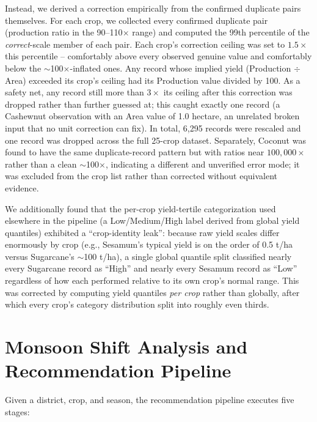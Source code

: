\documentclass[conference]{IEEEtran}
\begin{document}
Instead, we derived a correction empirically from the confirmed duplicate pairs
themselves. For each crop, we collected every confirmed duplicate pair (production
ratio in the 90--110$\times$ range) and computed the 99th percentile of the
\emph{correct}-scale member of each pair. Each crop's correction ceiling was set to
$1.5\times$ this percentile -- comfortably above every observed genuine value and
comfortably below the $\sim$100$\times$-inflated ones. Any record whose implied yield
(Production $\div$ Area) exceeded its crop's ceiling had its Production value divided
by 100. As a safety net, any record still more than $3\times$ its ceiling after this
correction was dropped rather than further guessed at; this caught exactly one record
(a Cashewnut observation with an Area value of 1.0 hectare, an unrelated broken input
that no unit correction can fix). In total, 6{,}295 records were rescaled and one
record was dropped across the full 25-crop dataset. Separately, Coconut was found to
have the same duplicate-record pattern but with ratios near $100{,}000\times$ rather
than a clean $\sim$100$\times$, indicating a different and unverified error mode; it
was excluded from the crop list rather than corrected without equivalent evidence.

We additionally found that the per-crop yield-tertile categorization used elsewhere in
the pipeline (a Low/Medium/High label derived from global yield quantiles) exhibited a
``crop-identity leak'': because raw yield scales differ enormously by crop (e.g.,
Sesamum's typical yield is on the order of 0.5 t/ha versus Sugarcane's $\sim$100 t/ha),
a single global quantile split classified nearly every Sugarcane record as ``High''
and nearly every Sesamum record as ``Low'' regardless of how each performed relative
to its own crop's normal range. This was corrected by computing yield quantiles
\emph{per crop} rather than globally, after which every crop's category distribution
split into roughly even thirds.

\section{Monsoon Shift Analysis and Recommendation Pipeline}

Given a district, crop, and season, the recommendation pipeline executes five stages:
\end{document}
